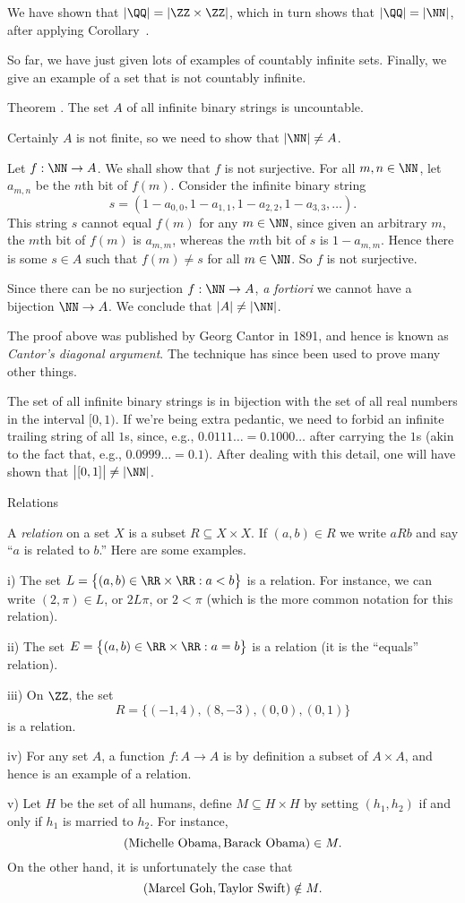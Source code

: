 We have shown that $|\QQ| = |\ZZ\times \ZZ|$, which in turn shows that $|\QQ| = |\NN|$, after
applying Corollary~{\corzedtwocountable}.\slug

So far, we have just given lots of examples of countably infinite sets. Finally, we give an example
of a set that is not countably infinite.

\proclaim Theorem \advthm. The set $A$ of all infinite binary strings is uncountable.

\proof Certainly $A$ is not finite, so we need to show that $|\NN|\ne A$.

Let $f : \NN\to A$. We shall show that $f$ is not surjective. For all $m,n\in \NN$, let $a_{m,n}$
be the $n$th bit of $f(m)$. Consider the infinite binary string
$$s = (1-a_{0,0},1-a_{1,1}, 1-a_{2,2}, 1-a_{3,3}, \ldots).$$
This string $s$ cannot equal $f(m)$ for any $m\in \NN$, since given an arbitrary $m$,
the $m$th bit of $f(m)$ is $a_{m,m}$, whereas the $m$th bit of $s$ is $1-a_{m,m}$. Hence there is some
$s\in A$ such that $f(m)\ne s$ for all $m\in \NN$. So $f$ is not surjective.

Since there can be no surjection $f:\NN\to A$, {\it a fortiori} we cannot have a bijection $\NN\to A$.
We conclude that $|A| \ne |\NN|$.\slug

The proof above was published by Georg Cantor in 1891, and hence is known as {\it Cantor's diagonal argument}.
The technique has since been used to prove many other things.

The set of all infinite binary strings is in bijection with the set of all real numbers in the interval
$[0,1)$. If we're being extra pedantic, we need to forbid an infinite trailing string of all $1$s,
since, e.g., $0.0111\ldots = 0.1000\ldots$ after carrying the $1$s (akin to the fact
that, e.g., $0.0999\ldots = 0.1$). After dealing with this detail, one will have shown that
$\bigl| [0,1]\bigr| \ne |\NN|$.

\advsect Relations

 A {\it relation} on a set $X$ is a subset $R\subseteq X\times X$. If $(a,b)\in R$
we write $aRb$ and say ``$a$ is related to $b$.'' Here are some examples.
\medskip
\item{i)} The set $L = \bigl\{(a,b)\in \RR\times\RR : a<b\bigr\}$ is a relation. For instance, we can
write $(2,\pi)\in L$, or $2L\pi$, or $2<\pi$ (which is the more common notation for this relation).
\smallskip
\item{ii)} The set $E = \bigl\{ (a,b) \in \RR\times \RR : a = b\bigr\}$ is a relation (it is the ``equals''
relation).
\smallskip
\item{iii)} On $\ZZ$, the set
$$R = \bigl\{(-1, 4), (8, -3), (0, 0), (0,1)\bigr\}$$
is a relation.
\smallskip
\item{iv)} For any set $A$, a function $f:A\to A$ is by definition a subset of $A\times A$, and hence
is an example of a relation.
\smallskip
\item{v)} Let $H$ be the set of all humans, define $M\subseteq H\times H$ by setting
$(h_1, h_2)$ if and only if $h_1$ is married to $h_2$. For instance,
$$(\hbox{Michelle Obama}, \hbox{Barack Obama})\in M.$$
On the other hand, it is unfortunately the case that
$$(\hbox{Marcel Goh}, \hbox{Taylor Swift})\notin M.$$
\medskip

